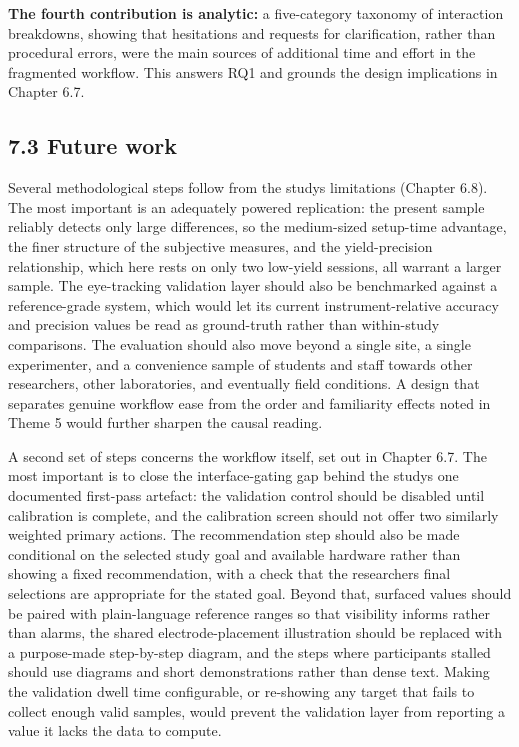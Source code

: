 \documentclass[
]{article}
\begin{document}
\textbf{The fourth contribution is analytic:} a five-category taxonomy of interaction breakdowns, showing that hesitations and requests for clarification, rather than procedural errors, were the main sources of additional time and effort in the fragmented workflow. This answers RQ1 and grounds the design implications in Chapter 6.7.

\hypertarget{future-work}{%
\subsection{7.3 Future work}\label{future-work}}

Several methodological steps follow from the study\textquotesingle s limitations (Chapter 6.8). The most important is an adequately powered replication: the present sample reliably detects only large differences, so the medium-sized setup-time advantage, the finer structure of the subjective measures, and the yield-precision relationship, which here rests on only two low-yield sessions, all warrant a larger sample. The eye-tracking validation layer should also be benchmarked against a reference-grade system, which would let its current instrument-relative accuracy and precision values be read as ground-truth rather than within-study comparisons. The evaluation should also move beyond a single site, a single experimenter, and a convenience sample of students and staff towards other researchers, other laboratories, and eventually field conditions. A design that separates genuine workflow ease from the order and familiarity effects noted in Theme 5 would further sharpen the causal reading.

A second set of steps concerns the workflow itself, set out in Chapter 6.7. The most important is to close the interface-gating gap behind the study\textquotesingle s one documented first-pass artefact: the validation control should be disabled until calibration is complete, and the calibration screen should not offer two similarly weighted primary actions. The recommendation step should also be made conditional on the selected study goal and available hardware rather than showing a fixed recommendation, with a check that the researcher\textquotesingle s final selections are appropriate for the stated goal. Beyond that, surfaced values should be paired with plain-language reference ranges so that visibility informs rather than alarms, the shared electrode-placement illustration should be replaced with a purpose-made step-by-step diagram, and the steps where participants stalled should use diagrams and short demonstrations rather than dense text. Making the validation dwell time configurable, or re-showing any target that fails to collect enough valid samples, would prevent the validation layer from reporting a value it lacks the data to compute.
\end{document}
